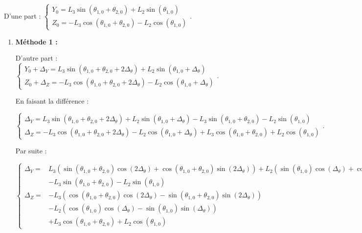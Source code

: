 \documentclass[11pt]{article}
\begin{document}
\begin{UPSTIcorrige}


D'une part : 
$
\left\{
\begin{array}{l}
Y_0 =  L_3 \sin  \left(\theta_{1,0}+ \theta_{2,0} \right)  + L_2 \sin \left(\theta_{1,0}  \right) \\
Z_0 =- L_3 \cos \left(\theta_{1,0} + \theta_{2,0} \right) - L_2 \cos \left(\theta_{1,0} \right)  
\end{array}.
\right.
$


\begin{enumerate}
\item \textbf{Méthode 1 : }

D'autre part : 
$
\left\{
\begin{array}{l}
Y_0 +\Delta_{Y}=  L_3 \sin  \left(\theta_{1,0}+ \theta_{2,0} + 2\Delta_{\theta} \right)  + L_2 \sin \left(\theta_{1,0} + \Delta_{\theta} \right) \\
Z_0 +\Delta_{Z}=- L_3 \cos \left(\theta_{1,0} + \theta_{2,0}+ 2\Delta_{\theta} \right) - L_2 \cos \left(\theta_{1,0}+\Delta_{\theta} \right)  
\end{array}.
\right.
$

En faisant la différence :

$
\left\{
\begin{array}{l}
\Delta_{Y}=  L_3 \sin  \left(\theta_{1,0}+ \theta_{2,0} + 2\Delta_{\theta} \right)  + L_2 \sin \left(\theta_{1,0} + \Delta_{\theta} \right)  - L_3 \sin  \left(\theta_{1,0}+ \theta_{2,0} \right)  - L_2 \sin \left(\theta_{1,0}  \right)\\
\Delta_{Z}=- L_3 \cos \left(\theta_{1,0} + \theta_{2,0}+ 2\Delta_{\theta} \right) - L_2 \cos \left(\theta_{1,0}+\Delta_{\theta} \right)   +  L_3 \cos \left(\theta_{1,0} + \theta_{2,0} \right) + L_2 \cos \left(\theta_{1,0} \right)
\end{array}.
\right.
$

Par suite : 

$
\left\{
\begin{array}{ll}
\Delta_{Y}=&   L_3 \left( \sin \left(\theta_{1,0}+ \theta_{2,0} \right) \cos \left( 2\Delta_{\theta} \right) + \cos \left(\theta_{1,0}+ \theta_{2,0}\right) \sin \left(2\Delta_{\theta} \right)\right) 
+ L_2 \left( \sin \left(\theta_{1,0} \right) \cos \left( \Delta_{\theta} \right) + \cos \left(\theta_{1,0}\right) \sin \left(\Delta_{\theta} \right)\right) \\
& - L_3 \sin  \left(\theta_{1,0}+ \theta_{2,0} \right)  - L_2 \sin \left(\theta_{1,0}  \right)\\
\Delta_{Z}=
&- L_3 \left(\cos \left(\theta_{1,0} + \theta_{2,0}\right) \cos\left(2\Delta_{\theta} \right)
- \sin \left(\theta_{1,0} + \theta_{2,0}\right) \sin\left(2\Delta_{\theta} \right) \right) \\
&- L_2 \left(\cos \left(\theta_{1,0} \right) \cos\left(\Delta_{\theta} \right)
- \sin \left(\theta_{1,0} \right) \sin\left(\Delta_{\theta} \right) \right)\\
&  +  L_3 \cos \left(\theta_{1,0} + \theta_{2,0} \right) + L_2 \cos \left(\theta_{1,0} \right)
\end{array}.
\right.
$


\end{enumerate}
\end{UPSTIcorrige}
\end{document}
